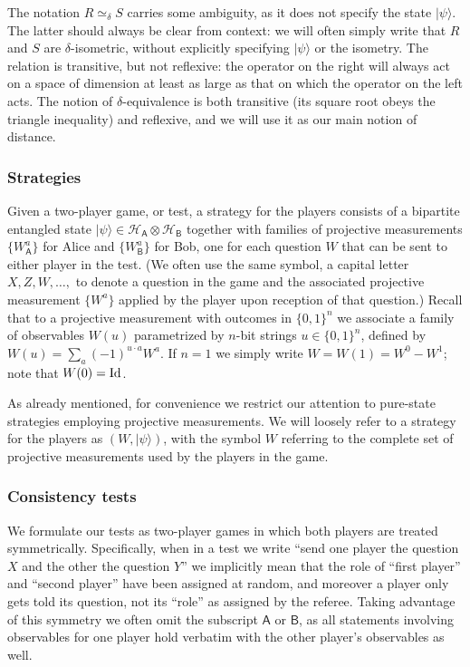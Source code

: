 \documentclass{toc}
\newcommand{\ket}[1]{|#1\rangle}
\newcommand{\Id}{\ensuremath{\mathop{\rm Id}\nolimits}}
\newcommand{\reg}[1]{{\textsf{#1}}}
\newcommand{\mH}{\mathcal{H}}
\begin{document}
The notation $R\simeq_\delta S$ carries some ambiguity, as it does not specify the state $\ket{\psi}$. The latter should always be clear from context: we will often simply write that $R$ and $S$ are $\delta$-isometric, without explicitly specifying $\ket{\psi}$ or the isometry. The relation is transitive, but not reflexive: the operator on the right will always act on a space of dimension at least as large as that on which the operator on the left acts. The notion of $\delta$-equivalence is both transitive (its square root obeys the triangle inequality) and reflexive, and we will use it as our main notion of distance. 

\subsubsection{Strategies}

Given a two-player game, or test, a strategy for the players consists of a bipartite entangled state $\ket{\psi} \in \mH_\reg{A} \otimes \mH_\reg{B}$ together with families of projective  measurements $\{W^a_\reg{A}\}$ for Alice and $\{W_\reg{B}^a\}$ for Bob, one for each question $W$ that can be sent to either player in the test. (We often use the same symbol, a capital letter $X,Z,W,\ldots,$ to denote a question in the game and the associated projective measurement $\{W^a\}$ applied by the player upon reception of that question.) 
 Recall that to a projective measurement with outcomes in $\{0,1\}^n$ we  associate a family of observables $W(u)$ parametrized by $n$-bit strings $u\in\{0,1\}^n$, defined by $W(u) = \sum_a (-1)^{u\cdot a} W^a$. If $n=1$ we simply write $W=W(1)=W^0-W^1$; note that $W(0)=\Id$.

As already mentioned, for convenience we restrict our attention to pure-state strategies employing projective measurements. 
We will loosely refer to a strategy for the players as $(W,\ket{\psi})$, with the symbol $W$ referring to the complete set of projective measurements used by the players in the game.

\subsubsection{Consistency tests}
\label{sec:cons-test}

We formulate our tests as two-player games in which both players are treated symmetrically. Specifically, when in a test we write ``send one player the question $X$ and the other the question $Y$'' we implicitly mean that the role of ``first player'' and ``second player'' have been assigned at random, and moreover a player only gets told its question, not its ``role'' as assigned by the referee. 
 Taking advantage of this symmetry we often omit the subscript $\reg{A}$ or $\reg{B}$, as all statements involving observables for one player hold verbatim with the other player's observables as well. 
\end{document}
